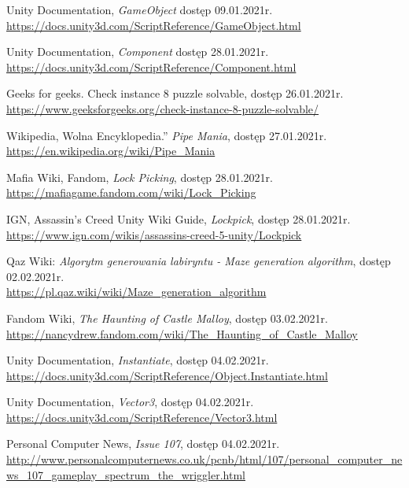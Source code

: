 \documentclass[oneside,polski,logo]{amuthesis}
\begin{document}
\begin{thebibliography}{100}
Unity Documentation, \emph{GameObject} dostęp 09.01.2021r.
\\ \url{https://docs.unity3d.com/ScriptReference/GameObject.html}

Unity Documentation, \emph{Component} dostęp 28.01.2021r.
\\ \url{https://docs.unity3d.com/ScriptReference/Component.html}

Geeks for geeks. Check instance 8 puzzle solvable, dostęp 26.01.2021r.
\\ \url{https://www.geeksforgeeks.org/check-instance-8-puzzle-solvable/}

Wikipedia, Wolna Encyklopedia.” \emph{Pipe Mania}, dostęp 27.01.2021r.
\\ \url{https://en.wikipedia.org/wiki/Pipe\_Mania}

Mafia Wiki, Fandom, \emph{Lock Picking}, dostęp 28.01.2021r.
\\ \url{https://mafiagame.fandom.com/wiki/Lock\_Picking}

IGN, Assassin's Creed Unity Wiki Guide, \emph{Lockpick}, dostęp 28.01.2021r.
\\ \url{https://www.ign.com/wikis/assassins-creed-5-unity/Lockpick}

Qaz Wiki: \emph{Algorytm generowania labiryntu - Maze generation algorithm}, dostęp 02.02.2021r.
\\ \url{https://pl.qaz.wiki/wiki/Maze\_generation\_algorithm}

Fandom Wiki, \emph{The Haunting of Castle Malloy}, dostęp 03.02.2021r.
\\ \url{https://nancydrew.fandom.com/wiki/The\_Haunting\_of\_Castle\_Malloy}

Unity Documentation, \emph{Instantiate}, dostęp 04.02.2021r.
\\ \url{https://docs.unity3d.com/ScriptReference/Object.Instantiate.html}

Unity Documentation, \emph{Vector3}, dostęp 04.02.2021r.
\\ \url{https://docs.unity3d.com/ScriptReference/Vector3.html}

Personal Computer News, \emph{Issue 107}, dostęp 04.02.2021r.
\\ \url{http://www.personalcomputernews.co.uk/pcnb/html/107/personal\_computer\_news\_107\_gameplay\_spectrum\_the\_wriggler.html}


\end{thebibliography}
\end{document}

